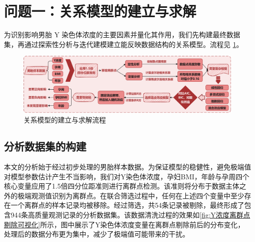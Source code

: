 \section{问题一：关系模型的建立与求解}
为识别影响男胎 Y 染色体浓度的主要因素并量化其作用，我们先构建最终数据集，再通过探索性分析与迭代建模建立能反映数据结构的关系模型。流程见 \cref{fig:关系模型的建立与求解流程}。

\begin{figure}[h]
	\centering
	\includegraphics[width=\textwidth]{figs/3问题一/问题一.pdf}
	\caption{关系模型的建立与求解流程}
	\label{fig:关系模型的建立与求解流程}
\end{figure}

\subsection{分析数据集的构建}
本文的分析始于经过初步处理的男胎样本数据。为保证模型的稳健性，避免极端值对模型参数估计产生不当影响，我们对Y染色体浓度，孕妇BMI，年龄与孕周四个核心变量应用了1.5倍四分位距准则进行离群点检测。该准则将分布于数据主体之外的极端观测值识别为离群点。在联合筛选过程中，任何在上述四个变量中至少存在一个离群点的样本记录均被移除。经过筛选，共54条记录被剔除，最终形成了包含944条高质量观测记录的分析数据集。该数据清洗过程的效果如\cref{fig:Y浓度离群点剔除可视化}所示，图中展示了Y染色体浓度变量在离群点剔除前后的分布变化，处理后的数据分布更为集中，减少了极端值可能带来的干扰。


